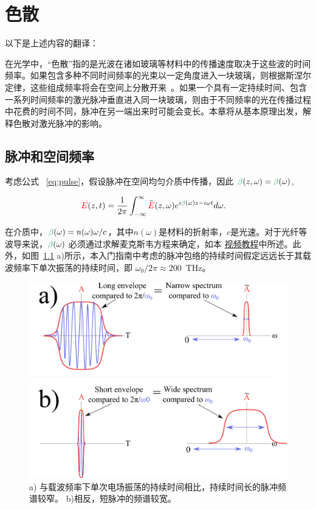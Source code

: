 \chapter{色散}
\label{ch:Dispersion}

以下是上述内容的翻译：

在光学中，“色散”指的是光波在诸如玻璃等材料中的传播速度取决于这些波的时间频率。如果包含多种不同时间频率的光束以一定角度进入一块玻璃，则根据斯涅尔定律，这些组成频率将会在空间上分散开来~\cite{Snell}。如果一个具有一定持续时间、包含一系列时间频率的激光脉冲垂直进入同一块玻璃，则由于不同频率的光在传播过程中花费的时间不同，脉冲在另一端出来时可能会变长。本章将从基本原理出发，解释色散对激光脉冲的影响。

\section{脉冲和空间频率}

考虑公式 ~\ref{eq:pulse}，假设脉冲在空间均匀介质中传播，因此 $\betag(z,\omega)=\betag(\omega)$,

\begin{align}
\label{eq:spatially_uniform}
    \E(z,t) &= \frac{1}{2\pi}\int_{-\infty}^{\infty} \Tilde{\E}(z,\omega) e^{i\betag(\omega)z-i\omega t} d\omega.
\end{align}

在介质中，$\betag(\omega)=n(\omega)\omega/c$，其中$n(\omega)$是材料的折射率，$c$是光速。对于光纤等波导来说，$\betag(\omega)$ 必须通过求解麦克斯韦方程来确定，如本 \href{https://youtu.be/z7fyT3etgis}{视频教程}中所述。此外，如图~\ref{fig:bandwidth} a)所示，本入门指南中考虑的脉冲包络的持续时间假定远远长于其载波频率下单次振荡的持续时间，即 $\omega_0/2\pi\approx 200$~THz。

\begin{figure}
    \centering
    \includegraphics[width=1\linewidth]{figures/bandwidth.png}
    \caption{a) 与载波频率下单次电场振荡的持续时间相比，持续时间长的脉冲频谱较窄。 b)相反，短脉冲的频谱较宽。}
    \label{fig:bandwidth}
\end{figure}

